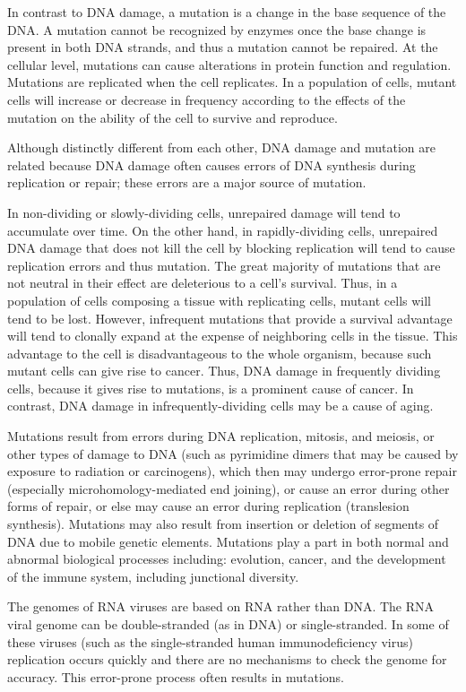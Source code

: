 In contrast to DNA damage, a mutation is a change in the base sequence of the DNA. A mutation cannot be recognized by enzymes once the base change is present in both DNA strands, and thus a mutation cannot be repaired. At the cellular level, mutations can cause alterations in protein function and regulation. Mutations are replicated when the cell replicates. In a population of cells, mutant cells will increase or decrease in frequency according to the effects of the mutation on the ability of the cell to survive and reproduce.

Although distinctly different from each other, DNA damage and mutation are related because DNA damage often causes errors of DNA synthesis during replication or repair; these errors are a major source of mutation.

In non-dividing or slowly-dividing cells, unrepaired damage will tend to accumulate over time. On the other hand, in rapidly-dividing cells, unrepaired DNA damage that does not kill the cell by blocking replication will tend to cause replication errors and thus mutation. The great majority of mutations that are not neutral in their effect are deleterious to a cell's survival. Thus, in a population of cells composing a tissue with replicating cells, mutant cells will tend to be lost. However, infrequent mutations that provide a survival advantage will tend to clonally expand at the expense of neighboring cells in the tissue. This advantage to the cell is disadvantageous to the whole organism, because such mutant cells can give rise to cancer. Thus, DNA damage in frequently dividing cells, because it gives rise to mutations, is a prominent cause of cancer. In contrast, DNA damage in infrequently-dividing cells may be a cause of aging.

Mutations result from errors during DNA replication, mitosis, and meiosis, or other types of damage to DNA (such as pyrimidine dimers that may be caused by exposure to radiation or carcinogens), which then may undergo error-prone repair (especially microhomology-mediated end joining), or cause an error during other forms of repair, or else may cause an error during replication (translesion synthesis). Mutations may also result from insertion or deletion of segments of DNA due to mobile genetic elements. Mutations play a part in both normal and abnormal biological processes including: evolution, cancer, and the development of the immune system, including junctional diversity.

The genomes of RNA viruses are based on RNA rather than DNA. The RNA viral genome can be double-stranded (as in DNA) or single-stranded. In some of these viruses (such as the single-stranded human immunodeficiency virus) replication occurs quickly and there are no mechanisms to check the genome for accuracy. This error-prone process often results in mutations.

